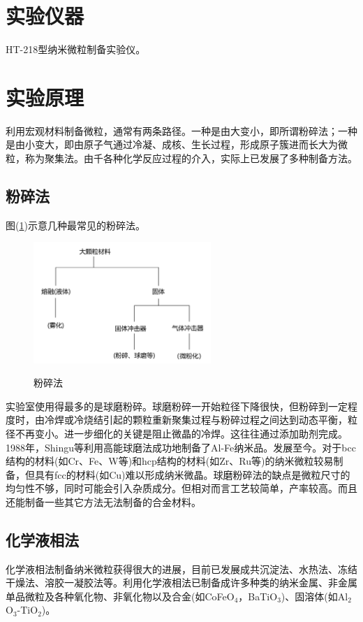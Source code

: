 \documentclass[a4paper]{article}
\begin{document}
\section{实验仪器}
HT-218型纳米微粒制备实验仪。

\section{实验原理}
利用宏观材料制备微粒，通常有两条路径。一种是由大变小，即所谓粉碎法；一种是由小变大，即由原子气通过冷凝、成核、生长过程，形成原子簇进而长大为微粒，称为聚集法。由千各种化学反应过程的介入，实际上已发展了多种制备方法。
\subsection{粉碎法}
图(\ref{fig3})示意几种最常见的粉碎法。
\begin{figure}[!ht]
\centering
\includegraphics[width=0.6\textwidth]{fig/fig3.pdf}\\
\caption{粉碎法}\label{fig3}
\end{figure}

实验室使用得最多的是球磨粉碎。球磨粉碎一开始粒径下降很快，但粉碎到一定程度时，由冷焊或冷烧结引起的颗粒重新聚集过程与粉碎过程之间达到动态平衡，粒径不再变小。进一步细化的关键是阻止微晶的冷焊。这往往通过添加助剂完成。1988年，Shingu等利用高能球磨法成功地制备了Al-Fe纳米品。发展至今。对于bcc结构的材料(如Cr、Fe、W等)和hcp结构的材料(如Zr、Ru等)的纳米微粒较易制备，但具有fcc的材料(如Cu)难以形成纳米微晶。球磨粉碎法的缺点是微粒尺寸的均匀性不够，同时可能会引入杂质成分。但相对而言工艺较简单，产率较高。而且还能制备一些其它方法无法制备的合金材料。
\subsection{化学液相法}
化学液相法制备纳米微粒获得很大的进展，目前已发展成共沉淀法、水热法、冻结干燥法、溶胶一凝胶法等。利用化学液相法已制备成许多种类的纳米金属、非金属单品微粒及各种氧化物、非氧化物以及合金(如CoFeO$_4$，BaTiO$_3$)、固溶体(如Al$_2$O$_3$-TiO$_2$)。
\end{document}

